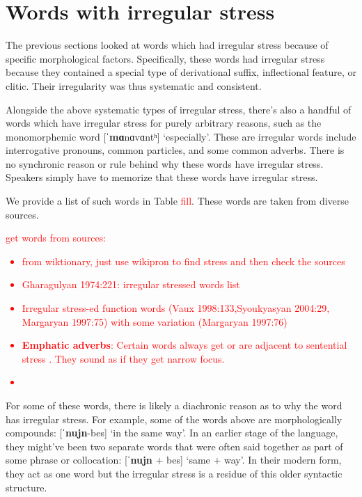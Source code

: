 \section{Words with irregular stress}\label{section:stress:irregularWord}
The previous sections looked at words which had irregular stress because of specific morphological factors. Specifically, these words had irregular stress because they contained a special type of derivational suffix, inflectional feature, or clitic. Their irregularity was thus systematic and consistent. 

Alongside the above systematic types of irregular stress, there's also a handful of words which have irregular stress for purely arbitrary reasons, such as the monomorphemic word [ˈ\textbf{mɑ}nɑvɑntʰ] `especially'.  These are irregular words include interrogative pronouns, common particles, and some common adverbs. There is no synchronic reason or rule behind why these words have irregular stress. Speakers simply have to memorize that these words have irregular stress. 

We provide a list of such words in Table \textcolor{red}{fill}. These words are taken from diverse sources. 

\textcolor{red}{get words from sources:
	\begin{itemize}
		\item from wiktionary, just use wikipron to find stress and then check the sources
		\item Gharagulyan 1974:221: irregular stressed words list
		\item Irregular stress-ed function words (Vaux 1998:133,Syoukyasyan 2004:29, Margaryan 1997:75) with some variation (Margaryan 1997:76) 
		\item \textbf{Emphatic adverbs}: 
		Certain words always get or are adjacent to sentential stress \citep[23]{Abeghyan-1933-Meter}. They sound as if they get narrow focus.
		\item  \armenian{\textcolor{red}{(Abeghyan 1933:23 - Prosody)
				Միայն     մինչեւ անգամ անգամ     նոյնիսկ
				Իսկ մանավանդ}}
\end{itemize}}

For some of these words, there is likely a diachronic reason as to why the word has irregular stress. For example, some of the words above are morphologically compounds: [ˈ\textbf{nujn}-bes] `in the same way'. In an earlier stage of the language, they might've been two separate words that were often said together as part of some phrase or collocation: [ˈ\textbf{nujn} +  bes] `same + way'. In their modern form, they act as one word but the irregular stress is a residue of this older syntactic structure. 

